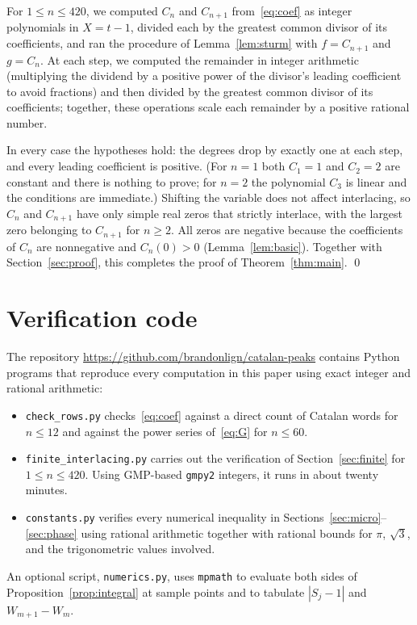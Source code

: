 \documentclass[11pt]{amsart}
\theoremstyle{remark}
\begin{document}
For $1\le n\le420$, we computed $C_n$ and $C_{n+1}$ from~\eqref{eq:coef} as
integer polynomials in $X=t-1$, divided each by the greatest common divisor
of its coefficients, and ran the procedure of Lemma~\ref{lem:sturm} with
$f=C_{n+1}$ and $g=C_n$. At each step, we computed the remainder in integer
arithmetic (multiplying the dividend by a positive power of the divisor's
leading coefficient to avoid fractions) and then divided by the greatest
common divisor of its coefficients; together, these operations scale each
remainder by a positive rational number.

In every case the hypotheses hold: the degrees drop by exactly one at each
step, and every leading coefficient is positive. (For $n=1$ both $C_1=1$ and
$C_2=2$ are constant and there is nothing to prove; for $n=2$ the polynomial
$C_3$ is linear and the conditions are immediate.) Shifting the variable does
not affect interlacing, so $C_n$ and $C_{n+1}$ have only simple real zeros that
strictly interlace, with the largest zero belonging to $C_{n+1}$ for $n\ge2$. All zeros are negative because the
coefficients of $C_n$ are nonnegative and $C_n(0)>0$
(Lemma~\ref{lem:basic}). Together with Section~\ref{sec:proof}, this
completes the proof of Theorem~\ref{thm:main}. \qed

\section*{Verification code}

The repository \url{https://github.com/brandonlign/catalan-peaks} contains
Python programs that reproduce every computation in this paper using exact
integer and rational arithmetic:
\begin{itemize}
\item \texttt{check\_rows.py} checks~\eqref{eq:coef} against a direct count
of Catalan words for $n\le12$ and against the power series of~\eqref{eq:G}
for $n\le60$.
\item \texttt{finite\_interlacing.py} carries out the verification of
Section~\ref{sec:finite} for $1\le n\le420$. Using GMP-based \texttt{gmpy2}
integers, it runs in about twenty minutes.
\item \texttt{constants.py} verifies every numerical inequality in
Sections~\ref{sec:micro}--\ref{sec:phase} using rational arithmetic together
with rational bounds for $\pi$, $\sqrt3$, and the trigonometric values
involved.
\end{itemize}
An optional script, \texttt{numerics.py}, uses \texttt{mpmath} to evaluate
both sides of Proposition~\ref{prop:integral} at sample points and to
tabulate $|S_j-1|$ and $W_{m+1}-W_m$.
\end{document}
